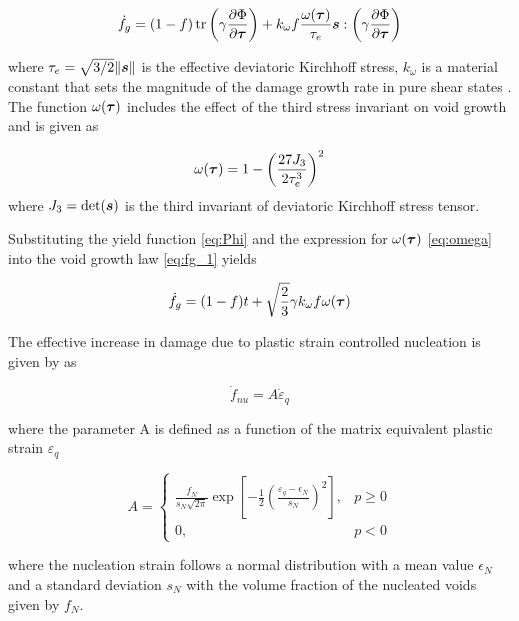 \begin{equation}\label{eq:fg_1}
\dot{f}_g = (1-f)\operatorname{\text{tr}}\left( \gamma\frac{\partial\Phi}{\partial{\boldsymbol{\tau}}}
\right) + k_{\omega}f\frac{\omega({\boldsymbol{\tau}})}{\tau_e}{\boldsymbol{s}}: \left(
\gamma\frac{\partial\Phi}{\partial{\boldsymbol{\tau}}} \right)
\end{equation}

where $\tau_e=\sqrt{3/2}\|{\boldsymbol{s}}\|$ is the effective deviatoric 
Kirchhoff stress, $k_{\omega}$ is a material constant that sets the 
magnitude of the damage growth rate in pure shear states 
\cite{Nahshon2008}. The function $\omega({\boldsymbol{\tau}})$ includes the effect 
of the third stress invariant on void growth and is given as

\begin{equation}\label{eq:omega}
\omega({\boldsymbol{\tau}}) = 1- \left(\frac{27J_3}{2\tau_e^3}\right)^2
\end{equation}
where $J_3=\det({\boldsymbol{s}})$ is the third invariant of deviatoric Kirchhoff
stress tensor.

Substituting the yield function \eqref{eq:Phi} and the expression for
$\omega({\boldsymbol{\tau}})$ \eqref{eq:omega} into the void growth law
\eqref{eq:fg_1} yields

\begin{equation}\label{eq:fg_final}
\dot{f}_g = (1-f)t + \sqrt{\frac{2}{3}}\gamma k_{\omega}f
\omega({\boldsymbol{\tau}})
\end{equation}

The effective increase in damage due to plastic strain controlled
nucleation is given by \cite{Chu1980} as

\begin{equation}\label{eq:dotf_nu}
\dot{f}_{nu} = A \dot{\varepsilon}_q
\end{equation}

where the parameter A is defined as a function of the matrix
equivalent plastic strain $\varepsilon_q$

\begin{equation}
A =
   \begin{cases}
     \frac{f_N}{s_N\sqrt{2\pi}}\exp\left[ -\frac{1}{2}\left(
       \frac{\varepsilon_q - \epsilon_N}{s_N}\right)^2\right], & p
     \geq 0\\ 0, & p <0
	\end{cases}
\end{equation}

where the nucleation strain follows a normal distribution with a mean
value $\epsilon_N$ and a standard deviation $s_N$ with the volume
fraction of the nucleated voids given by $f_N$.


